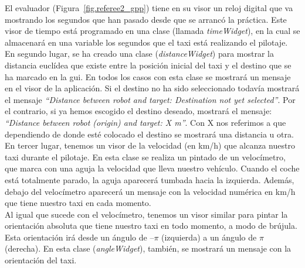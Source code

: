 El evaluador (Figura~\ref{fig.referee2_gpp}) tiene en su visor un reloj digital que va mostrando los segundos que han pasado desde que se arrancó la práctica. Este visor de tiempo está programado en una clase (llamada \textit{timeWidget}), en la cual se almacenará en una variable los segundos que el taxi está realizando el pilotaje.\\

En segundo lugar, se ha creado una clase (\textit{distanceWidget}) para mostrar la distancia euclídea que existe entre la posición inicial del taxi y el destino que se ha marcado en la \acrshort{gui}. En todos los casos con esta clase se mostrará un mensaje en el visor de la aplicación. Si el destino no ha sido seleccionado todavía mostrará el mensaje \textit{“Distance between robot and target: Destination not yet selected''}. Por el contrario, si ya hemos escogido el destino deseado, mostrará el mensaje: \textit{``Distance between robot (origin) and target: X m”}. Con X nos referimos a que dependiendo de donde esté colocado el destino se mostrará una distancia u otra.\\

En tercer lugar, tenemos un visor de la velocidad (en km/h) que alcanza nuestro taxi durante el pilotaje. En esta clase se realiza un pintado de un velocímetro, que marca con una aguja la velocidad que lleva nuestro vehículo. Cuando el coche está totalmente parado, la aguja aparecerá tumbada hacia la izquierda. Además, debajo del velocímetro aparecerá un mensaje con la velocidad numérica en km/h que tiene nuestro taxi en cada momento.\\

Al igual que sucede con el velocímetro, tenemos un visor similar para pintar la orientación absoluta que tiene nuestro taxi en todo momento, a modo de brújula. Esta orientación irá desde un ángulo de –\(\pi\) (izquierda) a un ángulo de \(\pi\) (derecha). En esta clase (\textit{angleWidget}), también, se mostrará un mensaje con la orientación del taxi.\\

